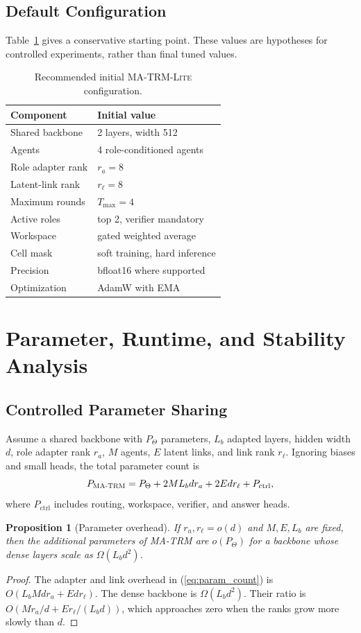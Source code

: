 \documentclass[10pt,a4paper,twocolumn]{article}
\newtheorem{proposition}{Proposition}
\newcommand{\MA}{\textsc{MA-TRM}}
\newcommand{\MALite}{\textsc{MA-TRM-Lite}}
\begin{document}
\subsection{Default Configuration}
Table~\ref{tab:default_config} gives a conservative starting point. These values are hypotheses for controlled experiments, rather than final tuned values.

\begin{table}[t]
\caption{Recommended initial \MALite{} configuration.}
\label{tab:default_config}
\centering
\small
\begin{tabular}{ll}
\toprule
Component & Initial value \\
\midrule
Shared backbone & 2 layers, width 512 \\
Agents & 4 role-conditioned agents \\
Role adapter rank & $r_a=8$ \\
Latent-link rank & $r_\ell=8$ \\
Maximum rounds & $T_{\max}=4$ \\
Active roles & top 2, verifier mandatory \\
Workspace & gated weighted average \\
Cell mask & soft training, hard inference \\
Precision & bfloat16 where supported \\
Optimization & AdamW with EMA \\
\bottomrule
\end{tabular}
\end{table}

\section{Parameter, Runtime, and Stability Analysis}
\subsection{Controlled Parameter Sharing}
Assume a shared backbone with $P_\Theta$ parameters, $L_b$ adapted layers, hidden width $d$, role adapter rank $r_a$, $M$ agents, $E$ latent links, and link rank $r_\ell$. Ignoring biases and small heads, the total parameter count is
\begin{equation}
P_{\MA}=P_\Theta+2ML_bdr_a+2Edr_\ell+P_{\mathrm{ctrl}}, \label{eq:param_count}
\end{equation}
where $P_{\mathrm{ctrl}}$ includes routing, workspace, verifier, and answer heads.

\begin{proposition}[Parameter overhead]
If $r_a,r_\ell=o(d)$ and $M,E,L_b$ are fixed, then the additional parameters of \MA{} are $o(P_\Theta)$ for a backbone whose dense layers scale as $\Omega(L_bd^2)$.
\end{proposition}
\begin{proof}
The adapter and link overhead in (\ref{eq:param_count}) is $O(L_bMdr_a+Edr_\ell)$. The dense backbone is $\Omega(L_bd^2)$. Their ratio is $O(Mr_a/d+Er_\ell/(L_bd))$, which approaches zero when the ranks grow more slowly than $d$.
\end{proof}
\end{document}
